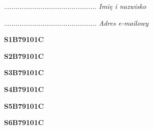 \begin{turn}{90}\begin{minipage}{\linewidth} \vspace{20mm} ................................................  \textit{Imię i nazwisko}\end{minipage}\end{turn}

\begin{turn}{90}\begin{minipage}{\linewidth} \vspace{20mm} ................................................  \textit{Adres e-mailowy}\end{minipage}\end{turn}

\begin{turn}{90}\huge \begin{minipage}{\linewidth} \vspace{10mm}\textbf{S1B79101C}\end{minipage}\end{turn}

\begin{turn}{90}\huge \begin{minipage}{\linewidth} \vspace{10mm}\textbf{S2B79101C}\end{minipage}\end{turn}

\begin{turn}{90}\huge \begin{minipage}{\linewidth} \vspace{10mm}\textbf{S3B79101C}\end{minipage}\end{turn}

\begin{turn}{90}\huge \begin{minipage}{\linewidth} \vspace{10mm}\textbf{S4B79101C}\end{minipage}\end{turn}

\begin{turn}{90}\huge \begin{minipage}{\linewidth} \vspace{10mm}\textbf{S5B79101C}\end{minipage}\end{turn}

\begin{turn}{90}\huge \begin{minipage}{\linewidth} \vspace{10mm}\textbf{S6B79101C}\end{minipage}\end{turn}

